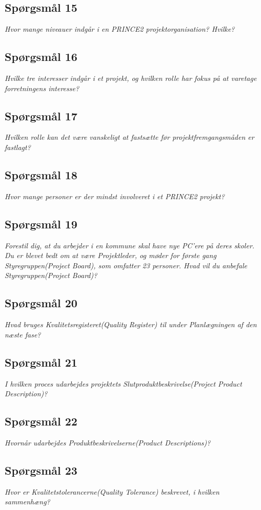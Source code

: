 \documentclass[12pt,twoside]{article}
\begin{document}
    \subsection{Spørgsmål 15}
    \textit{Hvor mange niveauer indgår i en PRINCE2 projektorganisation? Hvilke?}
    \subsection{Spørgsmål 16}
    \textit{Hvilke tre interesser indgår i et projekt, og hvilken rolle har fokus på at varetage forretningens interesse?}
    \subsection{Spørgsmål 17}
    \textit{Hvilken rolle kan det være vanskeligt at fastsætte før projektfremgangsmåden er fastlagt?}
    \subsection{Spørgsmål 18}
    \textit{Hvor mange personer er der mindst involveret i et PRINCE2 projekt?}
    \subsection{Spørgsmål 19}
    \textit{Forestil dig, at du arbejder i en kommune skal have nye PC’ere på deres skoler. Du er blevet bedt om at være Projektleder, og møder for første gang Styregruppen(Project Board), som omfatter 23 personer. Hvad vil du anbefale Styregruppen(Project Board)?}
    \subsection{Spørgsmål 20}
    \textit{Hvad bruges Kvalitetsregisteret(Quality Register) til under Planlægningen af den næste fase?}
    \subsection{Spørgsmål 21}
    \textit{I hvilken proces udarbejdes projektets Slutproduktbeskrivelse(Project Product Description)?}
    \subsection{Spørgsmål 22}
    \textit{Hvornår udarbejdes Produktbeskrivelserne(Product Descriptions)?}
    \subsection{Spørgsmål 23}
    \textit{Hvor er Kvalitetstolerancerne(Quality Tolerance) beskrevet, i hvilken sammenhæng?}
\end{document}
